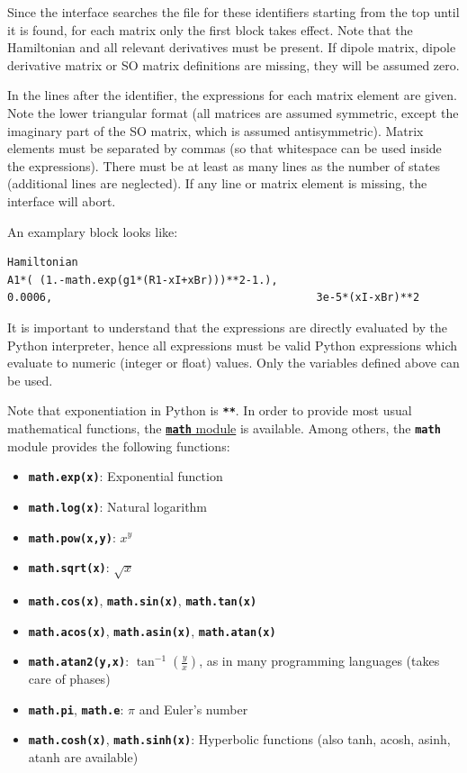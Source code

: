 \documentclass[a4paper,11pt,DIV=15,openany,twoside=false]{scrbook}
\newcommand{\ttt}[1]{\textbf{\texttt{#1}}}
\newenvironment{example}{
  \vspace{0mm}
  \definecolor{shadecolor}{HTML}{E4F4FF}
  \begin{shaded}
}{
  \end{shaded}
}
\begin{document}
Since the interface searches the file for these identifiers starting from the top until it is found, for each matrix only the first block takes effect. Note that the Hamiltonian and all relevant derivatives must be present. If dipole matrix, dipole derivative matrix or SO matrix definitions are missing, they will be assumed zero.

In the lines after the identifier, the expressions for each matrix element are given. Note the lower triangular format (all matrices are assumed symmetric, except the imaginary part of the SO matrix, which is assumed antisymmetric). Matrix elements must be separated by commas (so that whitespace can be used inside the expressions). There must be at least as many lines as the number of states (additional lines are neglected). If any line or matrix element is missing, the interface will abort.

An examplary block looks like:
\begin{example}
  \begin{verbatim}
Hamiltonian
A1*( (1.-math.exp(g1*(R1-xI+xBr)))**2-1.),
0.0006,                                         3e-5*(xI-xBr)**2
  \end{verbatim}
\end{example}
It is important to understand that the expressions are directly evaluated by the Python interpreter, hence all expressions must be valid Python expressions which evaluate to numeric (integer or float) values. Only the variables defined above can be used. 

Note that exponentiation in Python is \ttt{**}. In order to provide most usual mathematical functions, the \href{https://docs.python.org/2/library/math.html}{\ttt{math} module} is available. Among others, the \ttt{math} module provides the following functions:
\begin{itemize}
  \item \ttt{math.exp(x)}: Exponential function
  \item \ttt{math.log(x)}: Natural logarithm
  \item \ttt{math.pow(x,y)}: $x^y$
  \item \ttt{math.sqrt(x)}: $\sqrt{x}$
  \item \ttt{math.cos(x)}, \ttt{math.sin(x)}, \ttt{math.tan(x)}
  \item \ttt{math.acos(x)}, \ttt{math.asin(x)}, \ttt{math.atan(x)}
  \item \ttt{math.atan2(y,x)}: $\tan^{-1}\left(\frac{y}{x}\right)$, as in many programming languages (takes care of phases)
  \item \ttt{math.pi}, \ttt{math.e}: $\pi$ and Euler's number
  \item \ttt{math.cosh(x)}, \ttt{math.sinh(x)}: Hyperbolic functions (also tanh, acosh, asinh, atanh are available)
\end{itemize}
\end{document}
